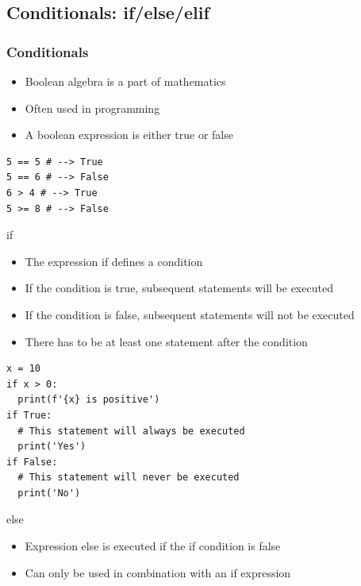 \documentclass[10pt, a4paper]{beamer} %
\begin{document}
\begin{frame}[c,allowframebreaks]
\end{frame}

\subsection{Conditionals: if/else/elif} %
\label{sub:conditionals}

\begin{frame}\frametitle{Conditionals}
\begin{itemize}
\item Boolean algebra is a part of mathematics
\item Often used in programming
\item A boolean expression is either true or false
\end{itemize}

\begin{lstlisting}
5 == 5 # --> True
5 == 6 # --> False
6 > 4 # --> True
5 >= 8 # --> False
\end{lstlisting}

\framebreak
{
  \footnotesize

\begin{examples}

  \begin{block}{\color{mLightBrown}if}

    \begin{itemize}
      \item The expression if defines a condition
      \item If the condition is true, subsequent statements will be executed
      \item If the condition is false, subsequent statements will not be executed
      \item There has to be at least one statement after the condition
    \end{itemize}

  \end{block}
\end{examples}

\begin{lstlisting}
x = 10
if x > 0:
  print(f'{x} is positive')
if True:
  # This statement will always be executed
  print('Yes')
if False:
  # This statement will never be executed
  print('No')
\end{lstlisting}
}
\framebreak

  \begin{block}{\color{mLightBrown}else}
    \begin{itemize}
    \item Expression else is executed if the if condition is false
    \item Can only be used in combination with an if expression      
    \end{itemize}
  \end{block}


\end{frame}
\end{document}
